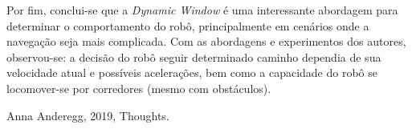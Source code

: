 \documentclass[12pt, a4paper]{article}
\begin{document}
	Por fim, conclui-se que a \textit{Dynamic Window} é uma interessante abordagem para determinar o comportamento do robô, principalmente em cenários onde a navegação seja mais complicada. Com as abordagens e experimentos dos autores, observou-se: a decisão do robô seguir determinado caminho dependia de sua velocidade atual e possíveis acelerações, bem como a capacidade do robô se locomover-se por corredores (mesmo com obstáculos).

	\begin{thebibliography}{2}

		 Anna Anderegg, 2019, Thoughts.
		
		\end{thebibliography}
		
	
\end{document}
